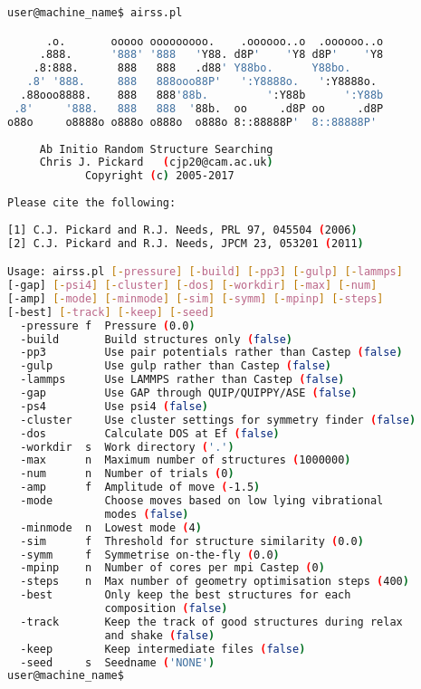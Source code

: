 \documentclass[a4paper, 10pt]{article}
\begin{document}
    \begin{lstlisting}[language={bash}]
user@machine_name$ airss.pl

      .o.       ooooo ooooooooo.    .oooooo..o  .oooooo..o 
     .888.      '888' '888   'Y88. d8P'    'Y8 d8P'    'Y8 
    .8:888.      888   888   .d88' Y88bo.      Y88bo.      
   .8' '888.     888   888ooo88P'   ':Y8888o.   ':Y8888o.  
  .88ooo8888.    888   888'88b.         ':Y88b      ':Y88b 
 .8'     '888.   888   888  '88b.  oo     .d8P oo     .d8P 
o88o     o8888o o888o o888o  o888o 8::88888P'  8::88888P'  
                                                      
     Ab Initio Random Structure Searching             
     Chris J. Pickard   (cjp20@cam.ac.uk)            
            Copyright (c) 2005-2017                   
                                                      
Please cite the following:                                 
                                                      
[1] C.J. Pickard and R.J. Needs, PRL 97, 045504 (2006)     
[2] C.J. Pickard and R.J. Needs, JPCM 23, 053201 (2011)    

Usage: airss.pl [-pressure] [-build] [-pp3] [-gulp] [-lammps] 
[-gap] [-psi4] [-cluster] [-dos] [-workdir] [-max] [-num] 
[-amp] [-mode] [-minmode] [-sim] [-symm] [-mpinp] [-steps] 
[-best] [-track] [-keep] [-seed]
  -pressure f  Pressure (0.0)
  -build       Build structures only (false)
  -pp3         Use pair potentials rather than Castep (false)
  -gulp        Use gulp rather than Castep (false)
  -lammps      Use LAMMPS rather than Castep (false)
  -gap         Use GAP through QUIP/QUIPPY/ASE (false)
  -ps4         Use psi4 (false)
  -cluster     Use cluster settings for symmetry finder (false)
  -dos         Calculate DOS at Ef (false)
  -workdir  s  Work directory ('.')
  -max      n  Maximum number of structures (1000000)
  -num      n  Number of trials (0)
  -amp      f  Amplitude of move (-1.5)
  -mode        Choose moves based on low lying vibrational 
               modes (false)
  -minmode  n  Lowest mode (4)
  -sim      f  Threshold for structure similarity (0.0)
  -symm     f  Symmetrise on-the-fly (0.0)
  -mpinp    n  Number of cores per mpi Castep (0)
  -steps    n  Max number of geometry optimisation steps (400)
  -best        Only keep the best structures for each 
               composition (false)
  -track       Keep the track of good structures during relax 
               and shake (false)
  -keep        Keep intermediate files (false)
  -seed     s  Seedname ('NONE')  
user@machine_name$
    \end{lstlisting}
\end{document}
